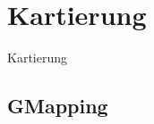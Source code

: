 \chapter{Kartierung} %
\label{cha:kartierung}

Kartierung

\section{GMapping} %
\label{sec:gmapping}


